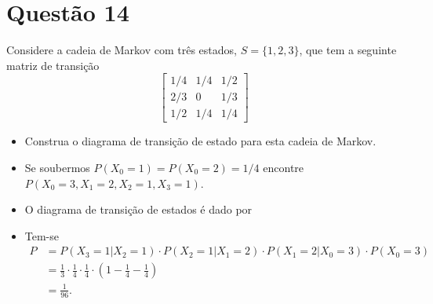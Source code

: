 \section{Questão 14}

Considere a cadeia de Markov com três estados, $S = \{1, 2, 3\}$, que tem a seguinte matriz de transição
%
$$
    \begin{bmatrix}
        1/4 & 1/4 & 1/2 \\
        2/3 & 0   & 1/3 \\
        1/2 & 1/4 & 1/4
    \end{bmatrix}
$$
%
\begin{itemize}
    \item [a)] Construa o diagrama de transição de estado para esta cadeia de Markov.
    \item [b)] Se soubermos $P(X_0 = 1) = P(X_0 = 2) = 1/4$ encontre $P(X_0=3, X_1=2, X_2=1, X_3=1)$.
\end{itemize}

\begin{respostas}
    \begin{itemize}
        \item [a)] O diagrama de transição de estados é dado por
        \begin{figure}[H]
            \centering
        \end{figure}

        \item [b)] Tem-se
        \begin{align}
            P
            &= P(X_3 = 1 | X_2 = 1) \cdot 
               P(X_2 = 1 | X_1 = 2) \cdot 
               P(X_1 = 2 | X_0 = 3) \cdot 
               P(X_0 = 3) \\ 
            &= \frac{1}{3} \cdot \frac{1}{4} \cdot \frac{1}{4} \cdot 
               \left(1-\frac{1}{4}-\frac{1}{4}\right) \\
            &= \frac{1}{96}.
        \end{align}
    \end{itemize}
\end{respostas}